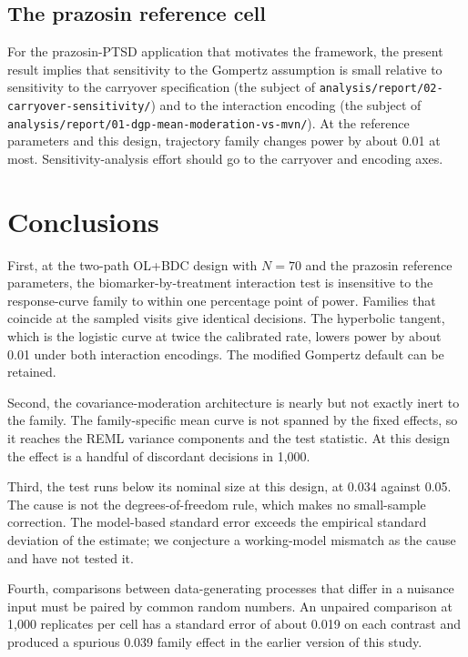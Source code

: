 \documentclass[
  11pt,
]{article}
\begin{document}
\subsection{The prazosin reference cell}\label{the-prazosin-reference-cell}

For the prazosin-PTSD application that motivates the framework, the
present result implies that sensitivity to the Gompertz assumption is
small relative to sensitivity to the carryover specification (the
subject of \texttt{analysis/report/02-carryover-sensitivity/}) and to the
interaction encoding (the subject of
\texttt{analysis/report/01-dgp-mean-moderation-vs-mvn/}). At the reference
parameters and this design, trajectory family changes power by about
0.01 at most. Sensitivity-analysis effort should go to the carryover
and encoding axes.

\section{Conclusions}\label{conclusions}

First, at the two-path OL+BDC design with \(N = 70\) and the prazosin
reference parameters, the biomarker-by-treatment interaction test is
insensitive to the response-curve family to within one percentage
point of power. Families that coincide at the sampled visits give
identical decisions. The hyperbolic tangent, which is the logistic
curve at twice the calibrated rate, lowers power by about 0.01 under
both interaction encodings. The modified Gompertz default can be
retained.

Second, the covariance-moderation architecture is nearly but not
exactly inert to the family. The family-specific mean curve is not
spanned by the fixed effects, so it reaches the REML variance
components and the test statistic. At this design the effect is a
handful of discordant decisions in 1,000.

Third, the test runs below its nominal size at this design, at
0.034 against
0.05. The cause is not the degrees-of-freedom rule, which makes no
small-sample correction. The model-based standard error exceeds the
empirical standard deviation of the estimate; we conjecture a
working-model mismatch as the cause and have not tested it.

Fourth, comparisons between data-generating processes that differ in
a nuisance input must be paired by common random numbers. An unpaired
comparison at 1,000 replicates per cell has a standard error of about
0.019 on each contrast and produced a spurious 0.039 family effect in
the earlier version of this study.
\end{document}
